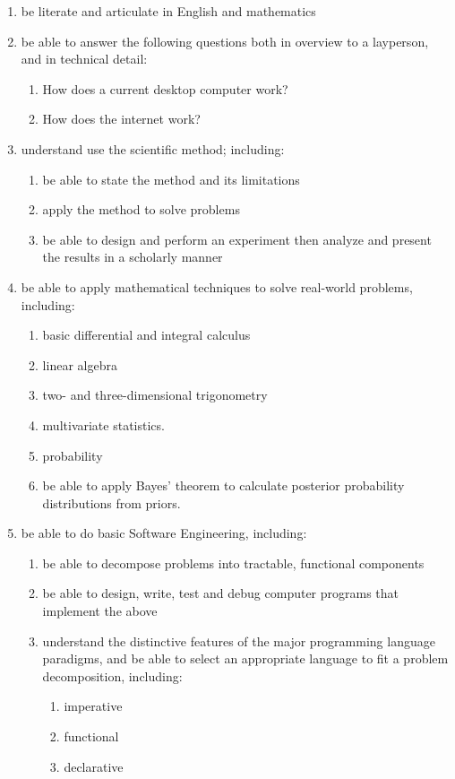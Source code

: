 \documentclass[draft]{article}
\begin{document}
\begin{enumerate}

\item be literate and articulate in English and mathematics

\item be able to answer the following questions both in overview to a layperson, and in technical detail:
  \begin{enumerate}
    \item How does a current desktop computer work?
    \item How does the internet work?
  \end{enumerate}

\item understand use the scientific method; including:
  \begin{enumerate}
    \item be able to state the method and its limitations
    \item apply the method to solve problems
    \item be able to design and perform an experiment then analyze and present the results in a scholarly manner
    \end{enumerate}

\item be able to apply mathematical techniques to solve real-world problems, including:
  \begin{enumerate}
    \item basic differential and integral calculus
    \item linear algebra
    \item two- and three-dimensional trigonometry
    \item multivariate statistics.
    \item probability
    \item be able to apply Bayes' theorem to calculate posterior probability distributions from priors.
  \end{enumerate}

\item be able to do basic Software Engineering, including:
  \begin{enumerate}
    \item be able to decompose problems into tractable, functional components
    \item be able to design, write, test and debug computer programs that implement the above

    \item understand the distinctive features of the major programming
      language paradigms, and be able to select an appropriate language
      to fit a problem decomposition, including:
      \begin{enumerate}
        \item imperative
        \item functional
        \item declarative
      \end{enumerate}


\end{enumerate}
\end{enumerate}
\end{document}

